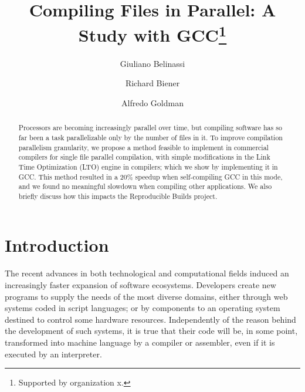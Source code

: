 \documentclass[runningheads]{llncs}
\begin{document}


%
\title{Compiling Files in Parallel: A Study with GCC\thanks{Supported by organization x.}}
%
%
\author{Giuliano Belinassi \and Richard Biener \and
Alfredo Goldman}
%
%

%
\maketitle              %
%
\begin{abstract}

Processors are becoming increasingly parallel over time, but compiling
software has so far been a task parallelizable only by the number of
files in it. To improve compilation parallelism granularity, we propose
a method feasible to implement in commercial compilers for single file
parallel compilation, with simple modifications in the Link Time
Optimization (LTO) engine in compilers; which we show by implementing
it in GCC. This method resulted in a 20\% speedup when self-compiling
GCC in this mode, and we found no meaningful slowdown when compiling
other applications. We also briefly discuss how this impacts the
Reproducible Builds project.

\end{abstract}
%
%
%
\section{Introduction}

The recent advances in both technological and computational fields induced an
increasingly faster expansion of software ecosystems. Developers create new
programs to supply the needs of the most diverse domains, either through web
systems coded in script languages; or by components to an operating system
destined to control some hardware resources. Independently of the reason behind
the development of such systems, it is true that their code will be, in some
point, transformed into machine language by a compiler or assembler, even if it
is executed by an interpreter.
\end{document}
